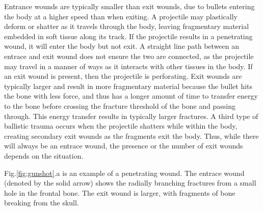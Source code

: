 \documentclass[titlepage]{article}
\begin{document}
Entrance wounds are typically smaller than exit wounds, due to bullets entering the body at a higher speed than when exiting. A projectile may plastically deform or shatter as it travels through the body, leaving fragmentary material embedded in soft tissue along its track. If the projectile results in a penetrating wound, it will enter the body but not exit. A straight line path between an entrace and exit wound does not ensure the two are connected, as the projectile may travel in a manner of ways as it interacts with other tissues in the body.\cite{ballistic-trauma} If an exit wound is present, then the projectile is perforating. Exit wounds are typically larger and result in more fragmentary material because the bullet hits the bone with less force, and thus has a longer amount of time to transfer energy to the bone before crossing the fracture threshold of the bone and passing through. This energy transfer results in typically larger fractures. A third type of ballistic trauma occurs when the projectile shatters while within the body, creating secondary exit wounds as the fragments exit the body. Thus, while there will always be an entrace wound, the presence or the number of exit wounds depends on the situation.

Fig.\ref{fig:gunshot}.a is an example of a penetrating wound. The entrace wound (denoted by the solid arrow) shows the radially branching fractures from a small hole in the frontal bone. The exit wound is larger, with fragments of bone breaking from the skull.
\end{document}

